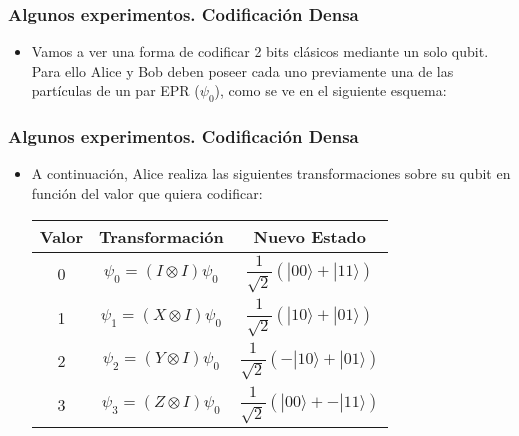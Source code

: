 \documentclass{beamer}
\newcommand{\base}[1]{|#1\rangle}
\begin{document}
\begin{frame}
	\frametitle{Algunos experimentos. Codificación Densa}
	\begin{itemize}
	\item Vamos a ver una forma de codificar 2 bits clásicos mediante un solo qubit. Para ello Alice y Bob deben poseer cada uno previamente una de las partículas de un par EPR ($\psi_0$), como se ve en el siguiente esquema:
	\end{itemize}
\end{frame}

\begin{frame}
	\frametitle{Algunos experimentos. Codificación Densa}
	\begin{itemize}
	\item A continuación, Alice realiza las siguientes transformaciones sobre su qubit en función del valor que quiera codificar:
	
	\begin{center}
 		\begin{tabular}{||c c c||} 
 		\hline
 		Valor & Transformación & Nuevo Estado \\ [0.8ex] 
	 	\hline\hline
 		0 & $\psi_0 = (I \otimes I)\psi_0$ &  $\dfrac{1}{\sqrt{2}}(\base{00} + \base{11})$ \\ 
 		\hline
	 	1 & $\psi_1 = (X \otimes I)\psi_0$ &  $\dfrac{1}{\sqrt{2}}(\base{10} + \base{01})$  \\
 		\hline
	 	2 & $\psi_2 = (Y \otimes I)\psi_0$ &  $\dfrac{1}{\sqrt{2}}(-\base{10} + \base{01})$  \\
	 	\hline
	 	3 & $\psi_3 = (Z \otimes I)\psi_0$ &  $\dfrac{1}{\sqrt{2}}(\base{00} + -\base{11})$ \\[1ex]
	 	\hline
		\end{tabular}
	\end{center}
	\end{itemize}
\end{frame}
\end{document}
